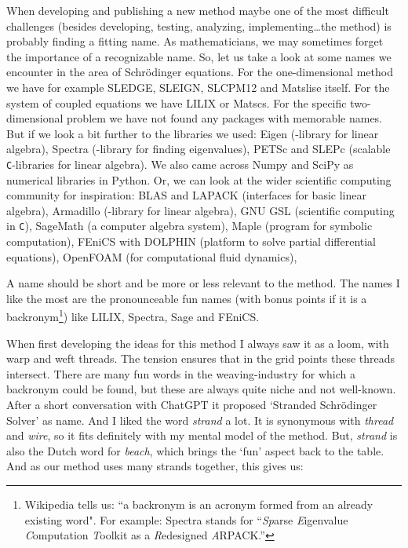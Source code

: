 When developing and publishing a new method maybe one of the most difficult challenges (besides developing, testing, analyzing, implementing\dots the method) is probably finding a fitting name. As mathematicians, we may sometimes forget the importance of a recognizable name. So, let us take a look at some names we encounter in the area of Schrödinger equations. For the one-dimensional method we have for example SLEDGE, SLEIGN, SLCPM12 and Matslise itself. For the system of coupled equations we have LILIX or Matscs. For the specific two-dimensional problem we have not found any packages with memorable names. But if we look a bit further to the libraries we used: Eigen (\cpp{}-library for linear algebra), Spectra (\cpp{}-library for finding eigenvalues), PETSc and SLEPc (scalable \texttt{C}-libraries for linear algebra). We also came across Numpy and SciPy as numerical libraries in Python. Or, we can look at the wider scientific computing community for inspiration: BLAS and LAPACK (interfaces for basic linear algebra), Armadillo (\cpp{}-library for linear algebra), GNU GSL (scientific computing in \texttt{C}), SageMath (a computer algebra system), Maple (program for symbolic computation), FEniCS with DOLPHIN (platform to solve partial differential equations), OpenFOAM (for computational fluid dynamics),

A name should be short and be more or less relevant to the method. The names I like the most are the pronounceable fun names (with bonus points if it is a backronym\footnote{Wikipedia tells us: ``a backronym is an acronym formed from an already existing word". For example: Spectra stands for ``\emph{Sp}arse \emph{E}igenvalue \emph{C}omputation \emph{T}oolkit as a \emph{R}edesigned \emph{A}RPACK.''}) like LILIX, Spectra, Sage and FEniCS.

When first developing the ideas for this method I always saw it as a loom, with warp and weft threads. The tension ensures that in the grid points these threads intersect. There are many fun words in the weaving-industry for which a backronym could be found, but these are always quite niche and not well-known. After a short conversation with ChatGPT it proposed `Stranded Schrödinger Solver' as name. And I liked the word \emph{strand} a lot. It is synonymous with \emph{thread} and \emph{wire}, so it fits definitely with my mental model of the method. But, \emph{strand} is also the Dutch word for \emph{beach}, which brings the `fun' aspect back to the table. And as our method uses many strands together, this gives us:


